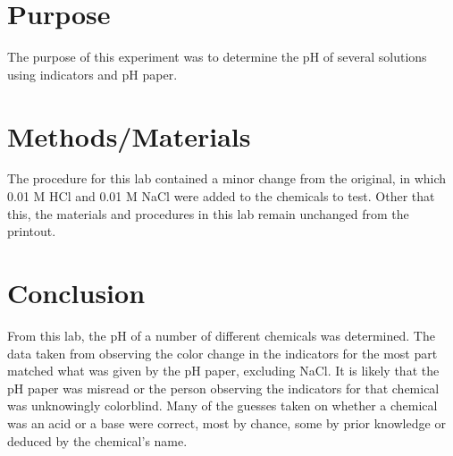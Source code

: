 \documentclass{article}
\begin{document}

\section{Purpose}

	The purpose of this experiment was to determine the pH of several solutions using indicators and pH paper.

\section{Methods/Materials}

	The procedure for this lab contained a minor change from the original, in which 0.01 M HCl and 0.01 M NaCl were added to the chemicals to test. Other that this, the materials and procedures in this lab remain unchanged from the printout.

\section{Conclusion}

	From this lab, the pH of a number of different chemicals was determined. The data taken from observing the color change in the indicators for the most part matched what was given by the pH paper, excluding NaCl. It is likely that the pH paper was misread or the person observing the indicators for that chemical was unknowingly colorblind. Many of the guesses taken on whether a chemical was an acid or a base were correct, most by chance, some by prior knowledge or deduced by the chemical's name.

\newpage
\end{document}

